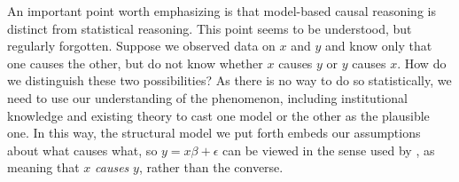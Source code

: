 \documentclass[11pt,reqno,titlepage]{amsart}
\begin{document}
\begin{doublespace}
An important point worth emphasizing is that model-based causal reasoning is distinct from statistical reasoning. 
This point seems to be understood, but regularly forgotten.
Suppose we observed data on $x$ and $y$ and know only that one causes the other, but do not know whether $x$ causes $y$ or $y$ causes $x$. 
How do we distinguish these two possibilities?
As there is no way to do so statistically, we need to use our understanding of the phenomenon, including institutional knowledge and existing theory to cast one model or the other as the plausible one.
In this way, the structural model we put forth embeds our assumptions about what causes what, so $y = x \beta + \epsilon$ can be viewed in the sense used by \citet{Goldberger:1972cq}, as meaning that $x$ \emph{causes} $y$, rather than the converse.





\end{doublespace}
\end{document}
